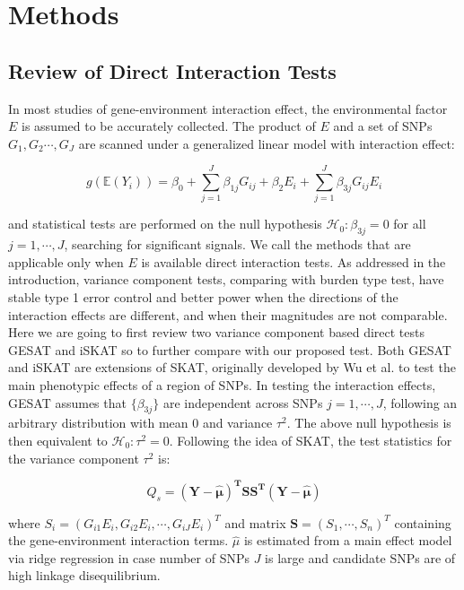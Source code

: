\documentclass{article}
\newcommand{\expec}{\mathbb{E}}
\begin{document}
\section{Methods}
\subsection{Review of Direct Interaction Tests}
 
In most studies of gene-environment interaction effect, the environmental factor $E$ is assumed to be accurately collected. The product of $E$ and a set of SNPs $G_1, G_2\cdots, G_J$ are scanned under a generalized linear model  with interaction effect:

\begin{equation}
g(\expec(Y_i))=\beta_0+\sum_{j=1}^J\beta_{1j}G_{ij} +\beta_2 E_i
+ \sum_{j=1}^J\beta_{3j} G_{ij}E_i
\end{equation}

and statistical tests are performed on the null hypothesis $\mathcal{H}_0: \beta_{3j}=0$ for all $j=1,\cdots,J$, searching for significant signals.  We call the methods that are applicable only when $E$ is available direct interaction tests. As addressed in the introduction, variance component tests, comparing with burden type test, have stable type 1 error control and better power when the directions of the interaction effects are different, and when their magnitudes are not comparable.  Here we are going to first review two variance component based direct tests GESAT and  iSKAT so to further compare with our proposed test. Both GESAT and  iSKAT are extensions of SKAT, originally developed by Wu et al.  \cite{wu2011rare} to test the main phenotypic effects of a region of SNPs. In testing the interaction effects, GESAT assumes that $\{\beta_{3j}\}$ are independent across SNPs $j=1,\cdots, J$, following an arbitrary distribution with mean 0 and variance $\tau^2$. The above null hypothesis is then equivalent to $\mathcal{H}_0: \tau^2=0$. Following the idea of SKAT, the test statistics for the variance component $\tau^2$ is:

\begin{equation}
Q_s =\mathbf{(Y-\widehat{\mu})^TSS^T(Y-\widehat{\mu})}
\end{equation}

\noindent where $S_i=(G_{i1}E_i, G_{i2}E_i, \cdots, G_{iJ}E_i)^T$ and matrix $\mathbf{S}=(S_1, \cdots, S_n)^T$  containing the gene-environment interaction terms. $\widehat{\mu}$  is estimated from a main effect model via ridge regression in case number of SNPs $J$ is large and candidate SNPs are of high linkage disequilibrium. 
\end{document}
